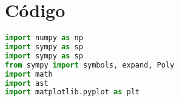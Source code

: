 \chapter{Código}




\begin{lstlisting}[language=Python]
    import numpy as np
import sympy as sp
import sympy as sp
from sympy import symbols, expand, Poly
import math
import ast
import matplotlib.pyplot as plt
\end{lstlisting}